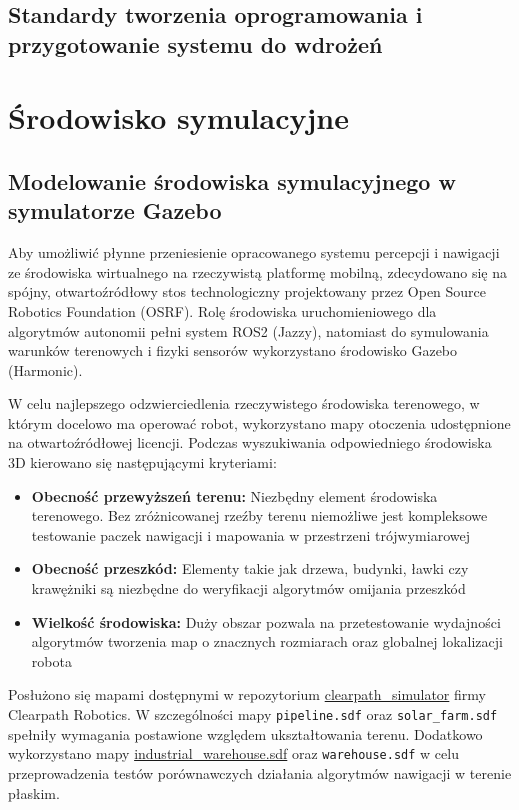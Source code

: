 \documentclass[a4paper,twoside,12pt]{book}
\begin{document}
\section{Standardy tworzenia oprogramowania i przygotowanie systemu do wdrożeń}

\chapter{Środowisko symulacyjne}

\section{Modelowanie środowiska symulacyjnego w symulatorze Gazebo}
Aby umożliwić płynne przeniesienie opracowanego systemu percepcji i nawigacji ze środowiska wirtualnego na rzeczywistą platformę mobilną, zdecydowano się na spójny, otwartoźródłowy stos technologiczny projektowany przez Open Source Robotics Foundation (OSRF). Rolę środowiska uruchomieniowego dla algorytmów autonomii pełni system ROS2 (Jazzy), natomiast do symulowania warunków terenowych i fizyki sensorów wykorzystano środowisko Gazebo (Harmonic).

W celu najlepszego odzwierciedlenia rzeczywistego środowiska terenowego, w którym docelowo ma operować robot, wykorzystano mapy otoczenia udostępnione na otwartoźródłowej licencji. Podczas wyszukiwania odpowiedniego środowiska 3D kierowano się następującymi kryteriami:
\begin{itemize}
    \item \textbf{Obecność przewyższeń terenu:} Niezbędny element środowiska terenowego. Bez zróżnicowanej rzeźby terenu niemożliwe jest kompleksowe testowanie paczek nawigacji i mapowania w przestrzeni trójwymiarowej
    \item \textbf{Obecność przeszkód:} Elementy takie jak drzewa, budynki, ławki czy krawężniki są niezbędne do weryfikacji algorytmów omijania przeszkód
    \item \textbf{Wielkość środowiska:} Duży obszar pozwala na przetestowanie wydajności algorytmów tworzenia map o znacznych rozmiarach oraz globalnej lokalizacji robota
\end{itemize}

Posłużono się mapami dostępnymi w repozytorium \href{https://github.com/clearpathrobotics/clearpath_simulator}{clearpath\_simulator} firmy Clearpath Robotics. W szczególności mapy \verb|pipeline.sdf| oraz \verb|solar_farm.sdf| spełniły wymagania postawione względem ukształtowania terenu. Dodatkowo wykorzystano mapy \href{https://app.gazebosim.org/maik/fuel/worlds/industrial-warehouse}{industrial\_warehouse.sdf} oraz \verb|warehouse.sdf| w celu przeprowadzenia testów porównawczych działania algorytmów nawigacji w terenie płaskim.
\end{document}
